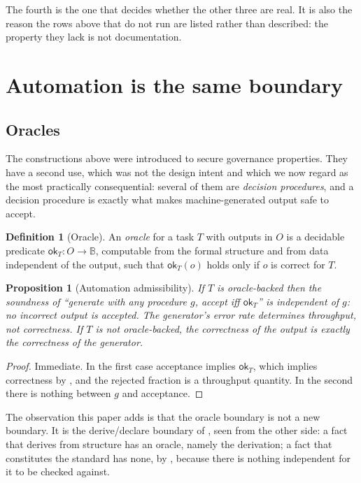 \documentclass[11pt,a4paper]{article}
\renewcommand{\_}{\oldunderscore\allowbreak}
\theoremstyle{plain}
\newtheorem{proposition}[theorem]{Proposition}
\theoremstyle{definition}
\newtheorem{definition}[theorem]{Definition}
\theoremstyle{definition}
\theoremstyle{remark}
\newcommand{\defn}[1]{\emph{#1}}
\begin{document}
The fourth is the one that decides whether the other three are real. It is also the reason the
rows above that do not run are listed rather than described: the property they lack is not
documentation.

\section{Automation is the same boundary}\label{sec:automation}

\subsection{Oracles}

The constructions above were introduced to secure governance properties. They have a second use, which was
not the design intent and which we now regard as the most practically consequential: several of them are
\emph{decision procedures}, and a decision procedure is exactly what makes machine-generated output safe to
accept.

\begin{definition}[Oracle]\label{def:oracle}
An \defn{oracle} for a task $T$ with outputs in $O$ is a decidable predicate
$\mathsf{ok}_T \colon O \to \mathbb{B}$, computable from the formal structure and from data independent of
the output, such that $\mathsf{ok}_T(o)$ holds only if $o$ is correct for $T$.
\end{definition}

\begin{proposition}[Automation admissibility]\label{prop:automation}
If $T$ is oracle-backed then the soundness of ``generate with any procedure $g$, accept iff
$\mathsf{ok}_T$'' is independent of $g$: no incorrect output is accepted. The generator's error rate
determines throughput, not correctness. If $T$ is not oracle-backed, the correctness of the output is
exactly the correctness of the generator.
\end{proposition}

\begin{proof}
Immediate. In the first case acceptance implies $\mathsf{ok}_T$, which implies correctness by
, and the rejected fraction is a throughput quantity. In the second there is nothing
between $g$ and acceptance.
\end{proof}

The observation this paper adds is that the oracle boundary is not a new boundary. It is the derive/declare
boundary of , seen from the other side: a fact that derives
from structure has an oracle, namely the derivation; a fact that constitutes the standard has none, by
, because there is nothing independent for it to be checked against.
\end{document}
